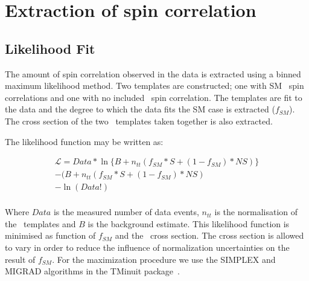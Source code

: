 \chapter{Extraction of spin correlation}

\section{Likelihood Fit}
\label{sec:extraction}

The amount of spin correlation observed in the data is extracted using a binned maximum likelihood method. Two templates are constructed; one with SM \ttbar\ spin correlations and one with no included \ttbar\ spin correlation. The templates are fit to the data and the degree to which the data fits the SM case is extracted ($f_{SM}$). The cross section of the two \ttbar\ templates taken together is also extracted. 

The likelihood function may be written as:

\begin{equation}
  \begin{aligned}
    \mathcal{L} = Data*\ln\{B + n_{tt}(f_{SM}*S + (1-f_{SM})*NS)\} \\
                  - (B + n_{tt}(f_{SM}*S + (1-f_{SM})*NS) \\
		  - \ln(Data!) \\
  \end{aligned}
\end{equation}

Where $Data$ is the measured number of data events, $n_{tt}$ is the normalisation of the \ttbar\ templates and $B$ is the background estimate. This likelihood function is minimised as function of $f_{SM}$ and the \ttbar\ cross section. The cross section is allowed to vary in order to reduce the influence of normalization uncertainties on the result of $f_{SM}$. For the maximization procedure we use the SIMPLEX and MIGRAD algorithms in the TMinuit package~\cite{James:1975dr}.




